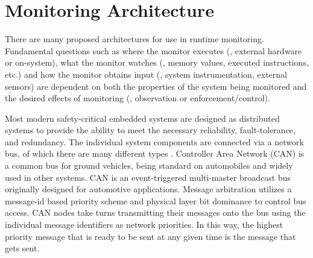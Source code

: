 
\section{Monitoring Architecture}
There are many proposed architectures for use in runtime monitoring. Fundamental questions such as where the monitor executes (\eg, external hardware or on-system), what the monitor watches (\eg, memory values, executed instructions, etc.) and how the monitor obtains input (\eg, system instrumentation, external sensors) are dependent on both the properties of the system being monitored and the desired effects of monitoring (\ie, observation or enforcement/control).  

Most modern safety-critical embedded systems are designed as distributed systems to provide the ability to meet the necessary reliability, fault-tolerance, and redundancy. The individual system components are connected via a network bus, of which there are many different types \cite{Rushby2001}. Controller Area Network (CAN) is a common bus for ground vehicles, being standard on automobiles and widely used in other systems. %
%
CAN is an event-triggered multi-master broadcast bus originally designed for automotive applications. Message arbitration utilizes a message-id based priority scheme and physical layer bit dominance to control bus access. CAN nodes take turns transmitting their messages onto the bus using the individual message identifiers as network priorities. In this way, the highest priority message that is ready to be sent at any given time is the message that gets sent.

